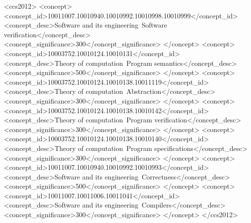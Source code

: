 \documentclass[acmsmall,nonacm]{acmart}
\begin{document}

\begin{CCSXML}
<ccs2012>
   <concept>
       <concept_id>10011007.10010940.10010992.10010998.10010999</concept_id>
       <concept_desc>Software and its engineering~Software verification</concept_desc>
       <concept_significance>300</concept_significance>
       </concept>
   <concept>
       <concept_id>10003752.10010124.10010131</concept_id>
       <concept_desc>Theory of computation~Program semantics</concept_desc>
       <concept_significance>500</concept_significance>
       </concept>
   <concept>
       <concept_id>10003752.10010124.10010138.10011119</concept_id>
       <concept_desc>Theory of computation~Abstraction</concept_desc>
       <concept_significance>300</concept_significance>
       </concept>
   <concept>
       <concept_id>10003752.10010124.10010138.10010142</concept_id>
       <concept_desc>Theory of computation~Program verification</concept_desc>
       <concept_significance>300</concept_significance>
       </concept>
   <concept>
       <concept_id>10003752.10010124.10010138.10010140</concept_id>
       <concept_desc>Theory of computation~Program specifications</concept_desc>
       <concept_significance>300</concept_significance>
       </concept>
   <concept>
       <concept_id>10011007.10010940.10010992.10010993</concept_id>
       <concept_desc>Software and its engineering~Correctness</concept_desc>
       <concept_significance>500</concept_significance>
       </concept>
   <concept>
       <concept_id>10011007.10011006.10011041</concept_id>
       <concept_desc>Software and its engineering~Compilers</concept_desc>
       <concept_significance>300</concept_significance>
       </concept>
 </ccs2012>
\end{CCSXML}



\maketitle
\end{document}

